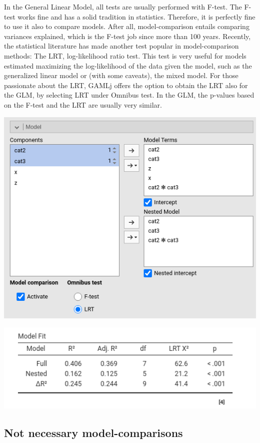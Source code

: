 \documentclass[
]{book}
\begin{document}
In the General Linear Model, all tests are usually performed with F-test. The F-test works fine and has a solid tradition in statistics. Therefore, it is perfectly fine to use it also to compare models. After all, model-comparison entails comparing variances explained, which is the F-test job since more than 100 years. Recently, the statistical literature has made another test popular in model-comparison methods: The LRT, log-likelihood ratio test. This test is very useful for models estimated maximizing the log-likelihood of the data given the model, such as the generalized linear model or (with some caveats), the mixed model. For those passionate about the LRT, {GAMLj} offers the option to obtain the LRT also for the GLM, by selecting {LRT} under {Omnibus test}. In the GLM, the p-values based on the F-test and the LRT are usually very similar.

\includegraphics[width=7.76in]{bookletpics/2_modelcomparison_input3}

\includegraphics[width=6.26in]{bookletpics/2_modelcomparison_output3}

\hypertarget{not-necessary-model-comparisons}{%
\subsection{Not necessary model-comparisons}\label{not-necessary-model-comparisons}}
\end{document}
